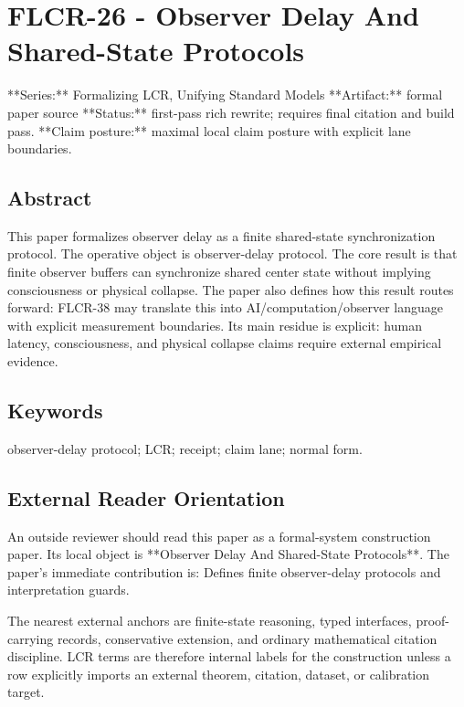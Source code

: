 \documentclass[11pt]{article}
\begin{document}
\section*{FLCR-26 - Observer Delay And Shared-State Protocols}

**Series:** Formalizing LCR, Unifying Standard Models
**Artifact:** formal paper source
**Status:** first-pass rich rewrite; requires final citation and build pass.
**Claim posture:** maximal local claim posture with explicit lane boundaries.

\subsection*{Abstract}

This paper formalizes observer delay as a finite shared-state synchronization protocol. The operative object is observer-delay protocol. The core result is that finite observer buffers can synchronize shared center state without implying consciousness or physical collapse. The paper also defines how this result routes forward: FLCR-38 may translate this into AI/computation/observer language with explicit measurement boundaries. Its main residue is explicit: human latency, consciousness, and physical collapse claims require external empirical evidence.

\subsection*{Keywords}

observer-delay protocol; LCR; receipt; claim lane; normal form.

\subsection*{External Reader Orientation}

An outside reviewer should read this paper as a formal-system construction paper. Its local object is **Observer Delay And Shared-State Protocols**. The paper's immediate contribution is: Defines finite observer-delay protocols and interpretation guards.

The nearest external anchors are finite-state reasoning, typed interfaces, proof-carrying records, conservative extension, and ordinary mathematical citation discipline. LCR terms are therefore internal labels for the construction unless a row explicitly imports an external theorem, citation, dataset, or calibration target.
\end{document}
